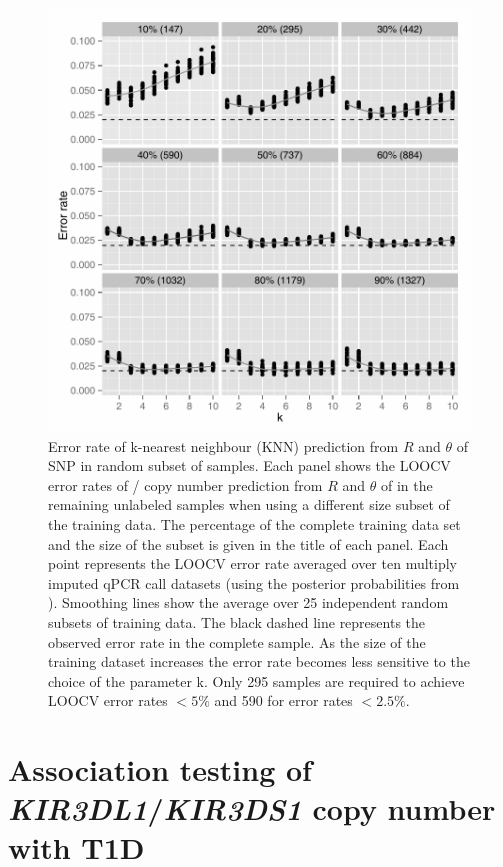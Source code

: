 \begin{figure}[h!]
  \centering
  \includegraphics[scale=.75]{figures/Figure-4.pdf}
  {Error rate of k-nearest neighbour (KNN) prediction from $R$ and $\theta$ of SNP  in random subset of samples.}
  { Each panel shows the LOOCV error rates of / copy number prediction
  from $R$ and $\theta$ of  in the remaining unlabeled samples
  when using a different size subset of the training data.
  The percentage of the complete training data set and the size of the subset is given in the title of each panel.
  Each point represents the LOOCV error rate averaged over ten multiply imputed qPCR call datasets
  (using the posterior probabilities from ). 
  Smoothing lines show the average over 25 independent random subsets of training data.
  The black dashed line represents the observed error rate in the complete sample.
  As the size of the training dataset increases the error rate becomes less sensitive to the choice of the parameter k.
  Only 295 samples are required to achieve LOOCV error rates $<5\%$ and 590 for error rates $<2.5\%$. }
\end{figure}

\section{Association testing of \emph{KIR3DL1}/\emph{KIR3DS1} copy number with T1D}

